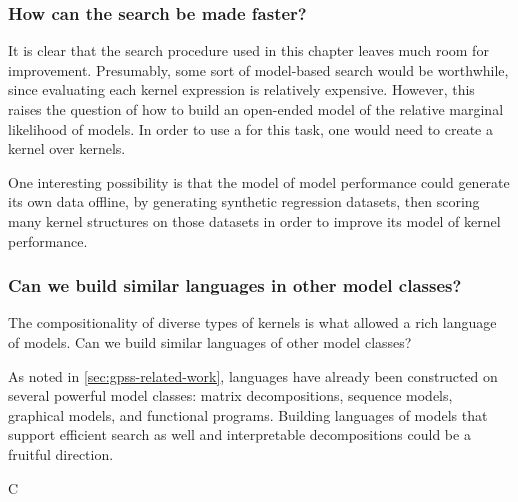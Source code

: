 \subsubsection{How can the search be made faster?}
It is clear that the search procedure used in this chapter leaves much room for improvement.
Presumably, some sort of model-based search would be worthwhile, since evaluating each kernel expression is relatively expensive.
However, this raises the question of how to build an open-ended model of the relative marginal likelihood of \gp{} models.
In order to use a \gp{} for this task, one would need to create a kernel over kernels.

One interesting possibility is that the model of model performance could generate its own data offline, by generating synthetic regression datasets, then scoring many kernel structures on those datasets in order to improve its model of kernel performance.

\subsubsection{Can we build similar languages in other model classes?}
The compositionality of diverse types of kernels is what allowed a rich language of \gp{} models.
Can we build similar languages of other model classes?

As noted in \cref{sec:gpss-related-work}, languages have already been constructed on several powerful model classes: matrix decompositions, sequence models, graphical models, and functional programs.
Building languages of models that support efficient search as well and interpretable decompositions could be a fruitful direction.
\fi

\outbpdocument{


}




C
